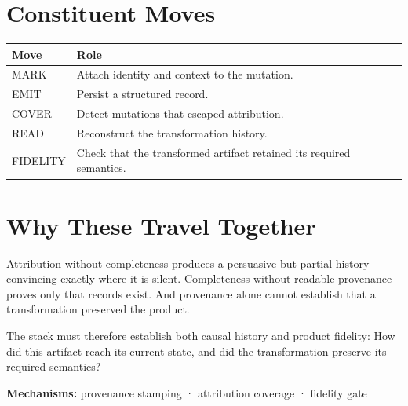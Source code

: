 \section{Constituent Moves}\label{heading:constituent-moves}

{\footnotesize
{\def\LTcaptype{none} %
\begin{longtable}[]{@{}
  >{\raggedright\arraybackslash}p{}
  >{\raggedright\arraybackslash}p{}@{}}
\toprule\noalign{}
\begin{minipage}[b]{\linewidth}\raggedright
Move
\end{minipage} & \begin{minipage}[b]{\linewidth}\raggedright
Role
\end{minipage} \\
\midrule\noalign{}
\endhead
\bottomrule\noalign{}
\endlastfoot
MARK & Attach identity and context to the mutation. \\
EMIT & Persist a structured record. \\
COVER & Detect mutations that escaped attribution. \\
READ & Reconstruct the transformation history. \\
FIDELITY & Check that the transformed artifact retained its required semantics. \\
\end{longtable}
}
}

\section{Why These Travel Together}\label{heading:why-these-travel-together}

Attribution without completeness produces a persuasive but partial history---convincing exactly where it is silent. Completeness without readable provenance proves only that records exist. And provenance alone cannot establish that a transformation preserved the product.

The stack must therefore establish both causal history and product fidelity: How did this artifact reach its current state, and did the transformation preserve its required semantics?

\textbf{Mechanisms:} provenance stamping · attribution coverage · fidelity gate
